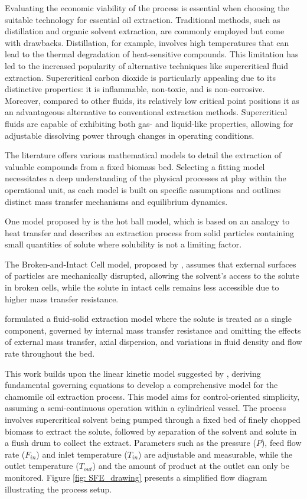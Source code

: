 \documentclass[../Article_Model_Parameters.tex]{subfiles}
\begin{document}
	Evaluating the economic viability of the process is essential when choosing the suitable technology for essential oil extraction. Traditional methods, such as distillation and organic solvent extraction, are commonly employed but come with drawbacks. Distillation, for example, involves high temperatures that can lead to the thermal degradation of heat-sensitive compounds. This limitation has led to the increased popularity of alternative techniques like supercritical fluid extraction. Supercritical carbon dioxide is particularly appealing due to its distinctive properties: it is inflammable, non-toxic, and is non-corrosive. Moreover, compared to other fluids, its relatively low critical point positions it as an advantageous alternative to conventional extraction methods. Supercritical fluids are capable of exhibiting both gas- and liquid-like properties, allowing for adjustable dissolving power through changes in operating conditions.
	
	The literature offers various mathematical models to detail the extraction of valuable compounds from a fixed biomass bed. Selecting a fitting model necessitates a deep understanding of the physical processes at play within the operational unit, as each model is built on specific assumptions and outlines distinct mass transfer mechanisms and equilibrium dynamics.
	
	One model proposed by \citet{Reverchon1993} is the hot ball model, which is based on an analogy to heat transfer and describes an extraction process from solid particles containing small quantities of solute where solubility is not a limiting factor.
	
	The Broken-and-Intact Cell model, proposed by \citet{Sovova1994}, assumes that external surfaces of particles are mechanically disrupted, allowing the solvent's access to the solute in broken cells, while the solute in intact cells remains less accessible due to higher mass transfer resistance.
	
	\citet{Reverchon1996} formulated a fluid-solid extraction model where the solute is treated as a single component, governed by internal mass transfer resistance and omitting the effects of external mass transfer, axial dispersion, and variations in fluid density and flow rate throughout the bed.
	
	This work builds upon the linear kinetic model suggested by \citet{Reverchon1996}, deriving fundamental governing equations to develop a comprehensive model for the chamomile oil extraction process. This model aims for control-oriented simplicity, assuming a semi-continuous operation within a cylindrical vessel. The process involves supercritical solvent being pumped through a fixed bed of finely chopped biomass to extract the solute, followed by separation of the solvent and solute in a flush drum to collect the extract. Parameters such as the pressure ($P$), feed flow rate ($F_{in}$) and inlet temperature ($T_{in}$) are adjustable and measurable, while the outlet temperature ($T_{out}$) and the amount of product at the outlet can only be monitored. Figure \ref{fig: SFE_drawing} presents a simplified flow diagram illustrating the process setup.
	
\end{document}
